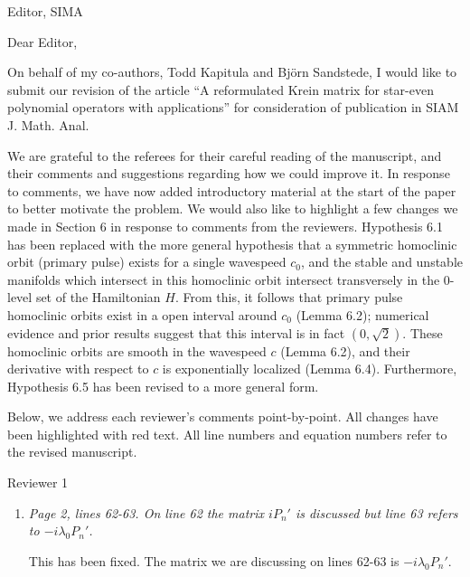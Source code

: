 \documentclass[11pt]{letter}
\begin{document}
\address{Ross Parker \\
Division of Applied Mathematics \\
Brown University \\
Providence, RI 02912 \\
\texttt{ross\_parker@brown.edu}}%
\signature{Ross Parker}
\begin{letter}{Editor, SIMA}

\opening{Dear Editor,}

On behalf of my co-authors, Todd Kapitula and Bj\"orn Sandstede, I would like to submit our revision of the article ``A reformulated Krein matrix for star-even polynomial operators with applications'' for consideration of publication in SIAM J. Math. Anal.

We are grateful to the referees for their careful reading of the manuscript, and their comments and suggestions regarding how we could improve it. In response to comments, we have now added introductory material at the start of the paper to better motivate the problem. We would also like to highlight a few changes we made in Section 6 in response to comments from the reviewers. Hypothesis 6.1 has been replaced with the more general hypothesis that a symmetric homoclinic orbit (primary pulse) exists for a single wavespeed $c_0$, and the stable and unstable manifolds which intersect in this homoclinic orbit intersect transversely in the 0-level set of the Hamiltonian $H$. From this, it follows that primary pulse homoclinic orbits exist in a open interval around $c_0$ (Lemma 6.2); numerical evidence and prior results suggest that this interval is in fact $(0, \sqrt{2})$. These homoclinic orbits are smooth in the wavespeed $c$ (Lemma 6.2), and their derivative with respect to $c$ is exponentially localized (Lemma 6.4). Furthermore, Hypothesis 6.5 has been revised to a more general form.

Below, we address each reviewer's comments point-by-point. All changes have been highlighted with red text. All line numbers and equation numbers refer to the revised manuscript.

Reviewer 1
\begin{enumerate}

\item \emph{Page 2, lines 62-63. On line 62 the matrix $iP_n'$ is discussed but line 63 refers to $-i\lambda_0 P_n'$.}
\vspace{4mm}

This has been fixed. The matrix we are discussing on lines 62-63 is $-i\lambda_0 P_n'$.


\end{enumerate}
\end{letter}
\end{document}
